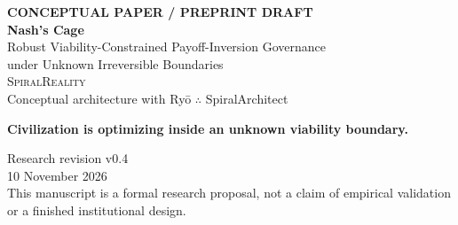 \documentclass[11pt,a4paper]{article}
\numberwithin{equation}{section}
\theoremstyle{definition}
\theoremstyle{plain}
\theoremstyle{remark}
\begin{document}
\hypersetup{pageanchor=false}
\begin{titlepage}
\thispagestyle{empty}
\centering
\vspace*{1.6cm}
{\small\bfseries\color{Moss}\MakeUppercase{Conceptual Paper / Preprint Draft}}\\[1.1cm]
{\fontsize{31}{36}\selectfont\bfseries\color{Forest} Nash's Cage}\\[0.55cm]
{\fontsize{17}{22}\selectfont\color{Earth}
Robust Viability-Constrained Payoff-Inversion Governance\\
under Unknown Irreversible Boundaries}\\[1.6cm]

{\Large\textsc{SpiralReality}}\\[0.35cm]
{\large Conceptual architecture with Ry\={o} $\therefore$ SpiralArchitect}\\[1.5cm]

\begin{tcolorbox}[width=0.84\textwidth,colback=Mist,colframe=Forest,boxrule=0.8pt]
\centering\large\bfseries
Civilization is optimizing inside an unknown viability boundary.
\end{tcolorbox}

\vfill
{\large Research revision v0.4}\\[0.2cm]
{\large 10 November 2026}\\[1cm]
{\small This manuscript is a formal research proposal, not a claim of empirical validation or a finished institutional design.}
\end{titlepage}
\hypersetup{pageanchor=true}
\setcounter{page}{1}
\end{document}
